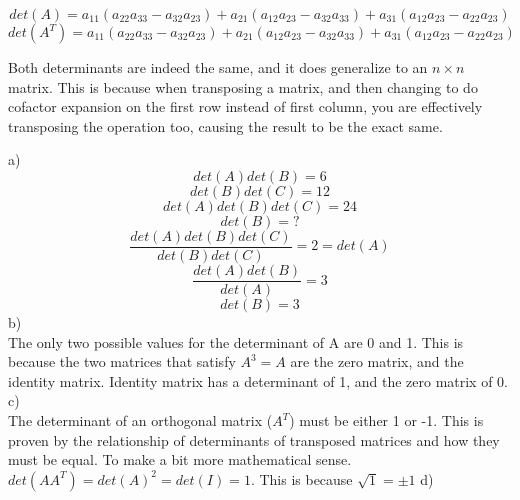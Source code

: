 \documentclass[12pt]{article}
\newenvironment{problem}[2][Problem]{\begin{trivlist}
\item[\hskip \labelsep {\bfseries #1}\hskip \labelsep {\bfseries #2.}]}{\end{trivlist}}
\begin{document}
\[det(A) = a_{11}(a_{22}a_{33} - a_{32}a_{23}) + a_{21}(a_{12}a_{23} - a_{32}a_{33}) + a_{31}(a_{12}a_{23} - a_{22}a_{23})\]
\[det(A^T) = a_{11}(a_{22}a_{33} - a_{32}a_{23}) + a_{21}(a_{12}a_{23} - a_{32}a_{33}) + a_{31}(a_{12}a_{23} - a_{22}a_{23})\]

Both determinants are indeed the same, and it does generalize to an $n\times n$ matrix. This is because when transposing a matrix, and then changing to do cofactor expansion on the first row instead of first column, you are effectively transposing the operation too, causing the result to be the exact same.

\begin{problem}{10}
a)\\
\[det(A)det(B) = 6\]
\[det(B)det(C) = 12\]
\[det(A)det(B)det(C) = 24\]
\[det(B) = ?\]
\[\frac{det(A)det(B)det(C)}{det(B)det(C)} = 2 = det(A)\]
\[\frac{det(A)det(B)}{det(A)} = 3\]
\[det(B) = 3\]
b)\\
The only two possible values for the determinant of A are 0 and 1. This is because the two matrices that satisfy $A^3 = A$ are the zero matrix, and the identity matrix. Identity matrix has a determinant of 1, and the zero matrix of 0.\\
c)\\
The determinant of an orthogonal matrix ($A^T$) must be either 1 or -1. This is proven by the relationship of determinants of transposed matrices and how they must be equal. To make a bit more mathematical sense. $det(AA^T) = det(A)^2 = det(I) = 1$. This is because $\sqrt{1} = \pm 1$
d)\\

\end{problem}
\end{document}
